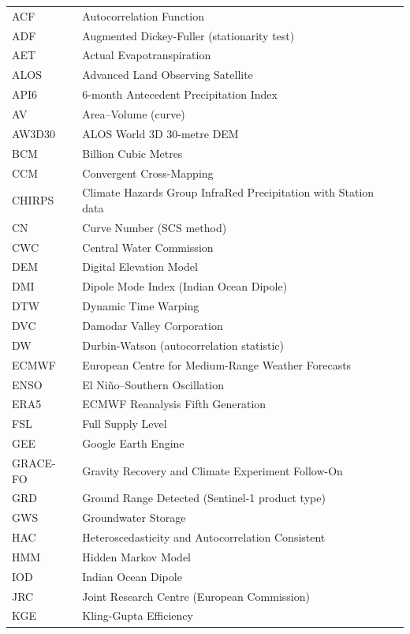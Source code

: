 \documentclass[12pt,a4paper,oneside]{report}
\begin{document}
\begin{longtable}{ll}
  ACF     & Autocorrelation Function \\
  ADF     & Augmented Dickey-Fuller (stationarity test) \\
  AET     & Actual Evapotranspiration \\
  ALOS    & Advanced Land Observing Satellite \\
  API6    & 6-month Antecedent Precipitation Index \\
  AV      & Area--Volume (curve) \\
  AW3D30  & ALOS World 3D 30-metre DEM \\
  BCM     & Billion Cubic Metres \\
  CCM     & Convergent Cross-Mapping \\
  CHIRPS  & Climate Hazards Group InfraRed Precipitation with Station data \\
  CN      & Curve Number (SCS method) \\
  CWC     & Central Water Commission \\
  DEM     & Digital Elevation Model \\
  DMI     & Dipole Mode Index (Indian Ocean Dipole) \\
  DTW     & Dynamic Time Warping \\
  DVC     & Damodar Valley Corporation \\
  DW      & Durbin-Watson (autocorrelation statistic) \\
  ECMWF   & European Centre for Medium-Range Weather Forecasts \\
  ENSO    & El Ni\~{n}o--Southern Oscillation \\
  ERA5    & ECMWF Reanalysis Fifth Generation \\
  FSL     & Full Supply Level \\
  GEE     & Google Earth Engine \\
  GRACE-FO & Gravity Recovery and Climate Experiment Follow-On \\
  GRD     & Ground Range Detected (Sentinel-1 product type) \\
  GWS     & Groundwater Storage \\
  HAC     & Heteroscedasticity and Autocorrelation Consistent \\
  HMM     & Hidden Markov Model \\
  IOD     & Indian Ocean Dipole \\
  JRC     & Joint Research Centre (European Commission) \\
  KGE     & Kling-Gupta Efficiency \\

\end{longtable}
\end{document}
